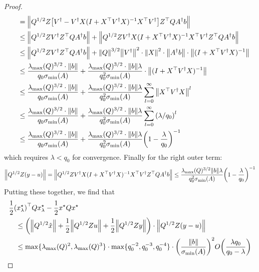 \documentclass[12pt]{article}
\begin{document}
\begin{proof}
\begin{align*}
      &\quad= {\left\lVert Q^{1/2} Z
          {\left[V^\dagger
            - V^\dagger X(I + X^\top V^\dagger X)^{-1} X^\top V^\dagger\right]}
          Z^\top Q A^\dagger b\right\rVert} \\
      &\quad\leq {\left\lVert Q^{1/2} Z V ^\dagger Z^\top Q A^\dagger b\right\rVert}
        + {\left\lVert Q^{1/2} Z V^\dagger X
          (I + X^\top V^\dagger X)^{-1} X^\top V^\dagger
          Z^\top Q A^\dagger b\right\rVert} \\
      &\quad\leq {\left\lVert Q^{1/2} Z V ^\dagger Z^\top Q A^\dagger b\right\rVert}
        + {\left\lVert Q\right\rVert}^{3/2} {\left\lVert V^\dagger\right\rVert}^2 \cdot {\left\lVert X\right\rVert}^2
          \cdot {\left\lVert A^\dagger b\right\rVert}
          \cdot {\left\lVert(I + X^\top V^\dagger X)^{-1}\right\rVert} \\
      &\quad\leq
        \frac{\lambda_{\max} (Q)^{3/2} \cdot {\left\lVert b\right\rVert}}{q_0 \sigma_{\min} (A)}
        + \frac{\lambda_{\max} (Q)^{3/2} \cdot {\left\lVert b\right\rVert} \lambda}
                {q_0 ^2 \sigma_{\min} (A)}
        \cdot {\left\lVert(I + X^\top V^\dagger X)^{-1}\right\rVert} \\
      &\quad\leq
        \frac{\lambda_{\max} (Q)^{3/2} \cdot {\left\lVert b\right\rVert}}{q_0 \sigma_{\min} (A)}
        + \frac{\lambda_{\max} (Q)^{3/2} \cdot {\left\lVert b\right\rVert} \lambda}
                {q_0 ^2 \sigma_{\min} (A)}
          \sum_{l = 0}^{\infty} {\left\lVert X^\top V^\dagger X\right\rVert}^l \\
      &\quad\leq
        \frac{\lambda_{\max} (Q)^{3/2} \cdot {\left\lVert b\right\rVert}}{q_0 \sigma_{\min} (A)}
        + \frac{\lambda_{\max} (Q)^{3/2} \cdot {\left\lVert b\right\rVert} \lambda}
                {q_0 ^2 \sigma_{\min} (A)}
          \sum_{l = 0}^{\infty} {\left(\lambda / q_0\right)}^l \\
      &\quad\leq
        \frac{\lambda_{\max} (Q)^{3/2} \cdot {\left\lVert b\right\rVert}}{q_0 \sigma_{\min} (A)}
        + \frac{\lambda_{\max} (Q)^{3/2} \cdot {\left\lVert b\right\rVert} \lambda}
                {q_0 ^2 \sigma_{\min} (A)}
            {\left(1 - \frac{\lambda}{q_0}\right)}^{-1}
  \end{align*}
  which requires \(\lambda < q_0\) for convergence.
  Finally for the right outer term:
  \begin{align*}
    {\left\lVert Q^{1/2} Z (y - u)\right\rVert}
      = {\left\lVert Q^{1/2} Z V^\dagger X
        (I + X^\top V^\dagger X)^{-1} X^\top V^\dagger Z^\top Q A ^\dagger b\right\rVert}
      \leq \frac{\lambda_{\max} (Q)^{3/2} {\left\lVert b\right\rVert} \lambda}{q_0 ^2 \sigma_{\min} (A)}
      {\left(1 - \frac{\lambda}{q_0}\right)}^{-1}
  \end{align*}
  Putting these together, we find that
  \begin{align*}
    &\frac{1}{2} {\left(x_\lambda ^\star\right)}^\top Q x_\lambda ^\star
      - \frac{1}{2} x^\star Q x^\star \\
    &\quad\leq
      {\left({\left\lVert Q^{1/2} \hat{x}\right\rVert}
        + \frac{1}{2} {\left\lVert Q^{1/2} Z u\right\rVert}
        + \frac{1}{2} {\left\lVert Q^{1/2} Z y\right\rVert}\right)}
            \cdot {\left\lVert Q^{1/2} Z (y - u)\right\rVert} \\
    &\quad \leq
      \max\{\lambda_{\max} (Q)^2, \lambda_{\max} (Q)^3\}
       \cdot \max\{q_0 ^{-2}, q_0 ^{-3}, q_0 ^{-4}\}
       \cdot {\left(\frac{{\left\lVert b\right\rVert}}{\sigma_{\min} (A)}\right)}^2
       O {\left(\frac{\lambda q_0}{q_0 - \lambda}\right)}
  \end{align*}

\end{proof}



\printbibliography
\end{document}
